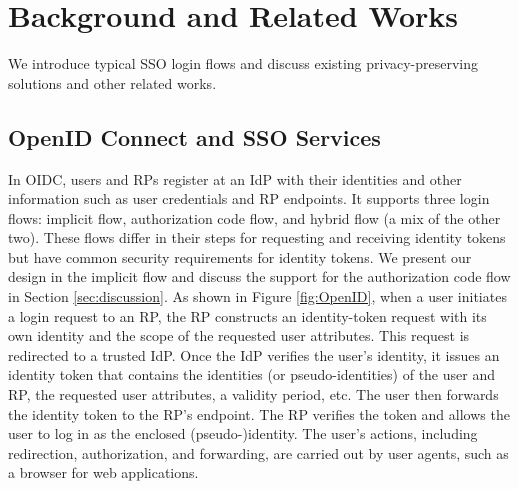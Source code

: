 \section{Background and Related Works}
\label{sec:background}

We introduce %
typical SSO login flows and discuss existing privacy-preserving solutions and other related works.

\subsection{OpenID Connect and SSO Services}
\label{subsec:OIDC}
In OIDC, users and RPs register at an IdP with their identities
and other information such as user credentials %
and RP endpoints. %
It supports three login flows: implicit flow, authorization code flow, and hybrid flow (a mix of the other two).
These flows differ in their steps for requesting and receiving identity tokens but have common security requirements for identity tokens.
We present our design in the implicit flow and discuss the support for the authorization code flow in Section \ref{sec:discussion}. 
As shown in Figure \ref{fig:OpenID}, when a user initiates a login request to an RP, the RP constructs an identity-token request with its own identity and the scope of the requested user attributes.
This request is redirected to a trusted IdP.
Once the IdP verifies the user's identity, it issues an identity token that contains the identities (or pseudo-identities) of the user and RP, the requested user attributes, a validity period, etc. The user then forwards the identity token to the RP's endpoint. The RP verifies the token and allows the user to log in as the  enclosed (pseudo-)identity.
The user's actions, including redirection, authorization, and forwarding, are carried out by user agents, such as a browser for web applications.

